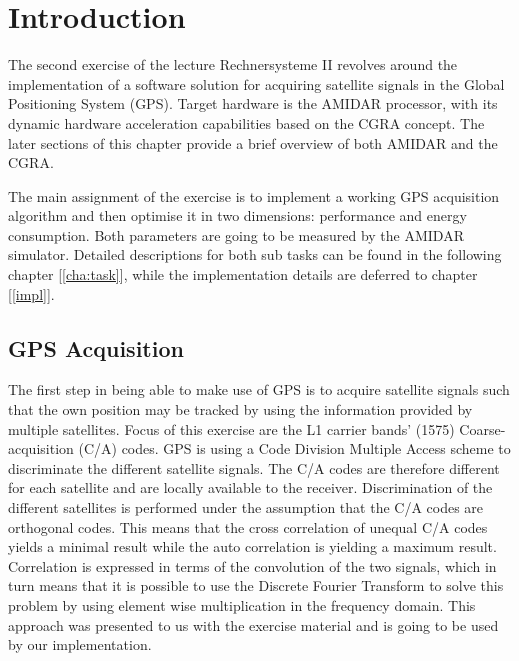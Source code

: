 \chapter{Introduction}
\label{cha:intro}
	The second exercise of the lecture Rechnersysteme II revolves around the implementation of a software solution for acquiring satellite signals in the Global Positioning System (GPS). Target hardware is the AMIDAR processor, with its dynamic hardware acceleration capabilities based on the CGRA concept. The later sections of this chapter provide a brief overview of both AMIDAR and the CGRA.

	The main assignment of the exercise is to implement a working GPS acquisition algorithm and then optimise it in two dimensions: performance and energy consumption. Both parameters are going to be measured by the AMIDAR simulator. Detailed descriptions for both sub tasks can be found in the following chapter [\ref{cha:task}], while the implementation details are deferred to chapter [\ref{impl}].

	\section{GPS Acquisition} %
	\label{sec:intro_acq}
		The first step in being able to make use of GPS is to acquire satellite signals such that the own position may be tracked by using the information provided by multiple satellites. 
		Focus of this exercise are the L1 carrier bands' (\si{1575}\mega\herz) Coarse-acquisition (C/A) codes. GPS is using a Code Division Multiple Access scheme to discriminate the different satellite signals. The C/A codes are therefore different for each satellite and are locally available to the receiver. 
		Discrimination of the different satellites is performed under the assumption that the C/A codes are orthogonal codes. This means that the cross correlation of unequal C/A codes yields a minimal result while the auto correlation is yielding a maximum result. Correlation is expressed in terms of the convolution of the two signals, which in turn means that it is possible to use the Discrete Fourier Transform to solve this problem by using element wise multiplication in the frequency domain. This approach was presented to us with the exercise material and is going to be used by our implementation.

